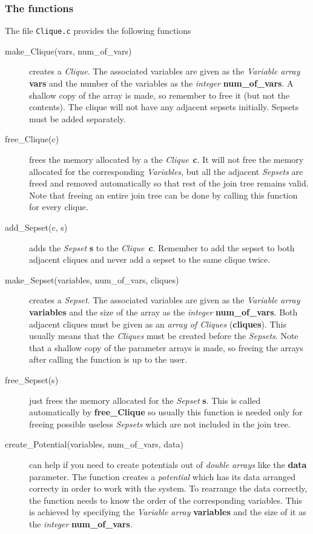 \documentclass[12pt,a4paper]{report}
\begin{document}
\subsubsection{The functions}
The file \verb+Clique.c+ provides the following functions
\begin{description}
\item[make\_Clique(vars, num\_of\_vars)] creates a {\it Clique}. The
associated variables are given as the {\it Variable array}
\textbf{vars} and the number of the variables as the {\it integer} 
\textbf{num\_of\_vars}. A shallow copy of the array is made, so
remember to free it (but not the contents). The clique will not have 
any adjacent sepsets initially. Sepsets must be added separately.
\item[free\_Clique(c)] frees the memory allocated by a the 
{\it Clique}~\textbf{c}. It will not free the memory allocated for 
the corresponding {\it Variables}, but all the adjacent {\it Sepsets} 
are freed and removed automatically so that rest of the join tree 
remains valid. Note that freeing an entire join tree can be done by 
calling this function for every clique.
\item[add\_Sepset(c, s)] adds the {\it Sepset} \textbf{s} to the 
{\it Clique}~\textbf{c}. Remember to add the sepset to both adjacent
cliques and never add a sepset to the same clique twice.
\item[make\_Sepset(variables, num\_of\_vars, cliques)] creates a {\it
Sepset}. The associated variables are given as the {\it Variable
array} \textbf{variables} and the size of the array as the {\it
integer} \textbf{num\_of\_vars}. Both adjacent cliques must be given
as an {\it array of Cliques} (\textbf{cliques}). This usually means that
the {\it Cliques} must be created before the {\it Sepsets}.
Note that a shallow copy of the parameter arrays is made, so freeing 
the arrays after calling the function is up to the user.
\item[free\_Sepset(s)] just frees the memory allocated for the {\it
Sepset} \textbf{s}. This is called automatically by
\textbf{free\_Clique} so usually this function is needed only for
freeing possible useless {\it Sepsets} which are not included in the 
join tree.
\item[create\_Potential(variables, num\_of\_vars, data)] can help if
you need to create potentials out of {\it double arrays} like 
the \textbf{data} parameter. The function creates a {\it potential} 
which has its data arranged correcty in order to work with the
system. To rearrange the data correctly, the function needs to know 
the order of the corresponding variables. This is achieved by 
specifying the {\it Variable array} \textbf{variables} and the size 
of it as the {\it integer} \textbf{num\_of\_vars}. 


\end{description}
\end{document}
